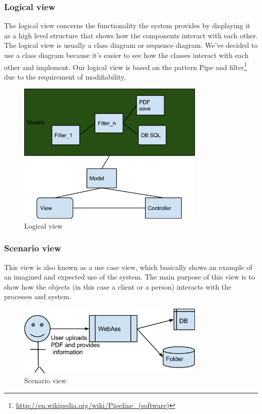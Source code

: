 \subsubsection{Logical view}
The logical view concerns the functionality the system provides by displaying it as a high level structure that shows how the components interact with each other. The logical view is usually a class diagram or sequence diagram. We've decided to use a class diagram because it's easier to see how the classes interact with each other and implement. Our logical view is based on the pattern Pipe and filter\footnote{\href{http://en.wikipedia.org/wiki/Pipeline_(software)}{http://en.wikipedia.org/wiki/Pipeline\_(software)}} due to the requirement of modifiability.
\begin{figure}[H]
\centering
\includegraphics[width=0.8\textwidth]{images/architecture00.png}
\caption{Logical view}
\label{fig:logical_view}
\end{figure}


\subsubsection{Scenario view}
This view is also known as a use case view, which basically shows an example of an imagined and expected use of the system. The main purpose of this view is to show how the objects (in this case a client or a person) interacts with the processes and system.
\begin{figure}[H]
\centering
\includegraphics[width=0.8\textwidth]{images/architecture01.png}
\caption{Scenario view}
\label{fig:scenario_view}
\end{figure}




